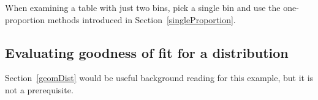 
When examining a table with just two bins,
pick a single bin and use the one-proportion methods
introduced in Section~\ref{singleProportion}.


\D{\newpage}

\subsection{Evaluating goodness of fit for a distribution}

Section~\ref{geomDist} would be useful background reading
for this example, but it is not a prerequisite.


\newcommand{\spyears}{10}
\newcommand{\spdays}{1362}
\newcommand{\spdaysA}{717}
\newcommand{\spdaysB}{369}
\newcommand{\spdaysC}{155}
\newcommand{\spdaysD}{69}
\newcommand{\spdaysE}{28}
\newcommand{\spdaysF}{14}
\newcommand{\spdaysG}{10}
\newcommand{\spdaysEA}{743}
\newcommand{\spdaysEB}{338}
\newcommand{\spdaysEC}{154}
\newcommand{\spdaysED}{70}
\newcommand{\spdaysEE}{32}
\newcommand{\spdaysEF}{14}
\newcommand{\spdaysEG}{12}
\newcommand{\spdaysEProp}{0.1128}
\newcommand{\spdaysEPerc}{11.28\%}
\newcommand{\spUpProp}{0.545}
\newcommand{\spUpPerc}{54.5\%}
\newcommand{\spDownProp}{0.455}
\newcommand{\spDownPerc}{45.5\%}
\newcommand{\spdaysXSq}{4.61}
\newcommand{\spdaysN}{7}
\newcommand{\spdaysDF}{6}
\newcommand{\spdaysPvalue}{0.5951}


